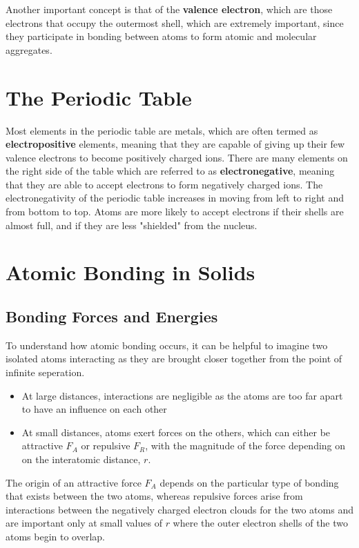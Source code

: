 \documentclass{article}
\begin{document}
Another important concept is that of the \textbf{valence electron}, which are those electrons that occupy the outermost shell, which are extremely important, since they participate in bonding between atoms to form atomic and molecular aggregates.

\section{The Periodic Table}

Most elements in the periodic table are metals, which are often termed as \textbf{electropositive} elements, meaning that they are capable of giving up their few valence electrons to become positively charged ions. There are many elements on the right side of the table which are referred to as \textbf{electronegative}, meaning that they are able to accept electrons to form negatively charged ions. The electronegativity of the periodic table increases in moving from left to right and from bottom to top. Atoms are more likely to accept electrons if their shells are almost full, and if they are less "shielded" from the nucleus.

\section{Atomic Bonding in Solids}

\subsection{Bonding Forces and Energies}

To understand how atomic bonding occurs, it can be helpful to imagine two isolated atoms interacting as they are brought closer together from the point of infinite seperation.

\begin{itemize}
    \item At large distances, interactions are negligible as the atoms are too far apart to have an influence on each other
    \item At small distances, atoms exert forces on the others, which can either be attractive $F_A$ or repulsive $F_R$, with the magnitude of the force depending on on the interatomic distance, $r$.
\end{itemize}

The origin of an attractive force $F_A$ depends on the particular type of bonding that exists between the two atoms, whereas repulsive forces arise from interactions between the negatively charged electron clouds for the two atoms and are important only at small values of $r$ where the outer electron shells of the two atoms begin to overlap.
\end{document}
